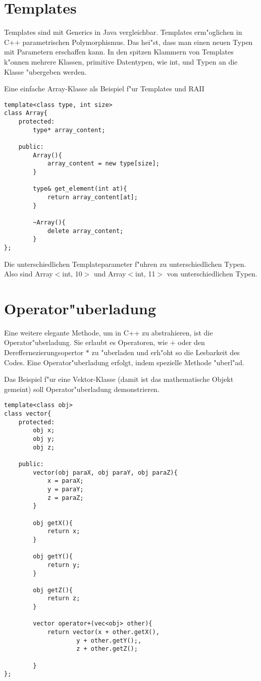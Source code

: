 \documentclass[14pt, a4paper]{report}
\begin{document}
\section{Templates}
Templates sind mit Generics in Java vergleichbar. Templates erm"oglichen in C++
parametrischen Polymorphismus. Das hei"st, dass man einen neuen Typen mit Parametern
erschaffen kann. In den spitzen Klammern von Templates k"onnen mehrere Klassen, 
primitive Datentypen, wie int, und Typen an die Klasse "ubergeben werden.

Eine einfache Array-Klasse als Beispiel f"ur Templates und RAII
\begin{lstlisting}
template<class type, int size>
class Array{
	protected:
		type* array_content;

	public:
		Array(){
			array_content = new type[size];
		}

		type& get_element(int at){
			return array_content[at];
		}

		~Array(){
			delete array_content;
		}
}; 
\end{lstlisting}

Die unterschiedlichen Templateparameter f"uhren zu unterschiedlichen Typen. Also sind 
Array$<$int, 10$>$ und Array$<$int, 11$>$ von unterschiedlichen Typen.

\section{Operator"uberladung}
Eine weitere elegante Methode, um in C++ zu abstrahieren, ist die Operator"uberladung.
Sie erlaubt es Operatoren, wie $+$ oder den Dereffernezierungsopertor $*$ zu "uberladen
und erh"oht so die Lesbarkeit des Codes. Eine Operator"uberladung erfolgt, indem
spezielle Methode "uberl"ad.

Das Beispiel f"ur eine Vektor-Klasse (damit ist das mathematische Objekt gemeint) soll
Operator"uberladung demonstrieren.

\begin{lstlisting}
template<class obj>
class vector{
	protected:
		obj x;
		obj y;
		obj z;

	public:
		vector(obj paraX, obj paraY, obj paraZ){
			x = paraX;
			y = paraY;
			z = paraZ;
		}

		obj getX(){
			return x;
		}

		obj getY(){
			return y;
		}
		
		obj getZ(){
			return z;
		}
		
		vector operator+(vec<obj> other){
			return vector(x + other.getX(), 
					y + other.getY();, 
					z + other.getZ(); 

		}
};
\end{lstlisting}
\end{document}

